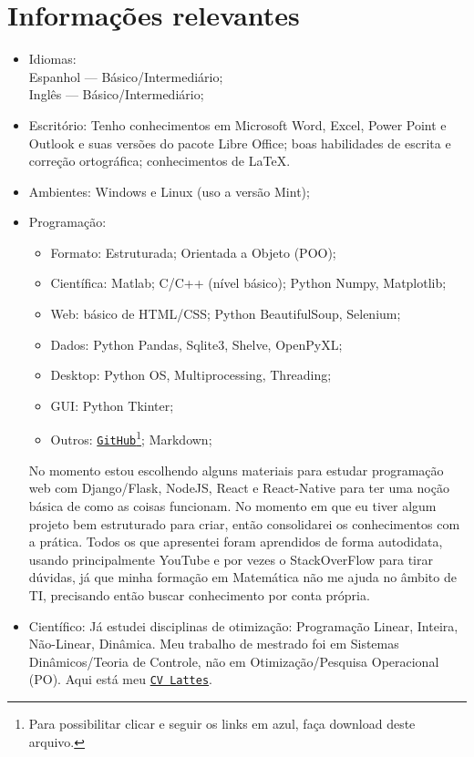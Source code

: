 \documentclass[11pt]{article}
\begin{document}
\section{Informações relevantes \dotfill}
\begin{itemize}
\item Idiomas: \\Espanhol --- Básico/Intermediário;\\ Inglês --- Básico/Intermediário;

\item Escritório: Tenho conhecimentos em Microsoft Word, Excel, Power Point e Outlook e suas versões do pacote Libre Office; boas habilidades de escrita e correção ortográfica; conhecimentos de LaTeX.

\item Ambientes: Windows e Linux (uso a versão Mint);

\item Programação:
\begin{itemize}
\item Formato: Estruturada; Orientada a Objeto (POO);
\item Científica: Matlab; C/C++ (nível básico); Python Numpy, Matplotlib;
\item Web: básico de HTML/CSS; Python BeautifulSoup, Selenium;
\item Dados: Python Pandas, Sqlite3, Shelve, OpenPyXL;
\item Desktop: Python OS, Multiprocessing, Threading;
\item GUI: Python Tkinter;
\item Outros: \href{https://github.com/j5r}{\texttt{GitHub}}\footnote{Para possibilitar clicar e seguir os links em azul, faça download deste arquivo.}; Markdown;
\end{itemize}
No momento estou escolhendo alguns materiais para estudar programação web com Django/Flask, NodeJS, React e React-Native para ter uma noção básica de como as coisas funcionam.  No momento em que eu tiver algum projeto bem estruturado para criar, então consolidarei os conhecimentos com a prática. Todos os que apresentei foram aprendidos de forma autodidata, usando principalmente YouTube e por vezes o StackOverFlow para tirar dúvidas, já que minha formação em Matemática não me ajuda no âmbito de TI, precisando então buscar conhecimento por conta própria.

\item Científico: Já estudei disciplinas de otimização: Programação Linear, Inteira, Não-Linear, Dinâmica. Meu trabalho de mestrado foi em Sistemas Dinâmicos/Teoria de Controle, não em Otimização/Pesquisa Operacional (PO).
Aqui está meu \href{http://lattes.cnpq.br/3866983332299702}{\texttt{CV Lattes}}.


\end{itemize}
\end{document}
